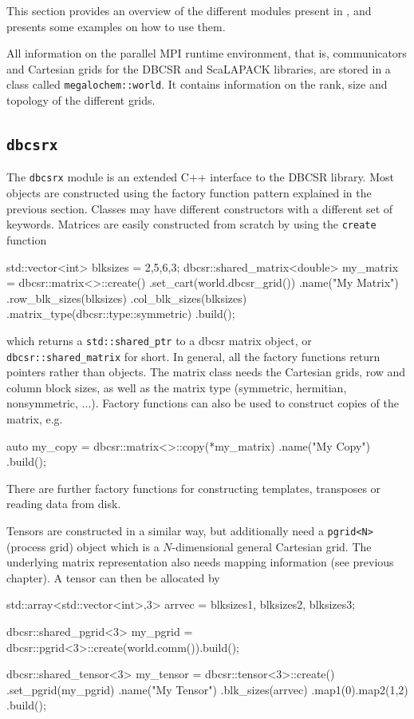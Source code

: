 This section provides an overview of the different modules present in \mchem{}, and presents some examples on how to use them. 

All information on the parallel MPI runtime environment, that is, communicators and Cartesian grids for the DBCSR and ScaLAPACK libraries, are stored in a class called \texttt{megalochem::world}. It contains information on the rank, size and topology of the different grids. 

\subsection{\texttt{dbcsrx}}

The \texttt{dbcsrx} module is an extended C++ interface to the DBCSR library. Most objects are constructed using the factory function pattern explained in the previous section. Classes may have different constructors with a different set of keywords. Matrices are easily constructed from scratch by using the \texttt{create} function
\begin{cppinline}
std::vector<int> blksizes = {2,5,6,3};
dbcsr::shared_matrix<double> 
my_matrix = dbcsr::matrix<>::create()
	.set_cart(world.dbcsr_grid())
	.name("My Matrix")
	.row_blk_sizes(blksizes)
	.col_blk_sizes(blksizes)
	.matrix_type(dbcsr::type::symmetric)
	.build();
\end{cppinline}
\noindent which returns a \texttt{std::shared\_ptr} to a dbcsr matrix object, or \texttt{dbcsr::shared\_matrix} for short. In general, all the factory functions return pointers rather than objects. The matrix class needs the Cartesian grids, row and column block sizes, as well as the matrix type (symmetric, hermitian, nonsymmetric, ...). Factory functions can also be used to construct copies of the matrix, e.g.
\begin{cppinline}
auto my_copy = dbcsr::matrix<>::copy(*my_matrix)
	.name("My Copy")
	.build();
\end{cppinline}
\noindent There are further factory functions for constructing templates, transposes or reading data from disk.

Tensors are constructed in a similar way, but additionally need a \texttt{pgrid<N>} (process grid) object which is a $N$-dimensional general Cartesian grid. The underlying matrix representation also needs mapping information (see previous chapter). A tensor can then be allocated by
\begin{cppinline}
std::array<std::vector<int>,3> 
arrvec = {blksizes1, blksizes2, blksizes3};

dbcsr::shared_pgrid<3> 
my_pgrid = dbcsr::pgrid<3>::create(world.comm()).build();

dbcsr::shared_tensor<3>
my_tensor = dbcsr::tensor<3>::create()
	.set_pgrid(my_pgrid)
	.name("My Tensor")	
	.blk_sizes(arrvec)
	.map1({0}).map2({1,2})
	.build();
\end{cppinline} 

